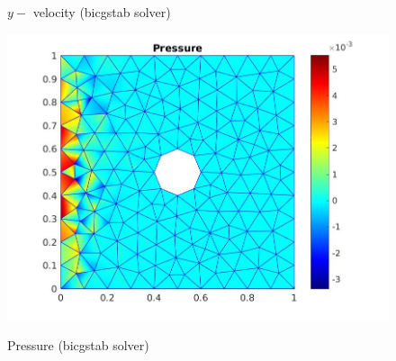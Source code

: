 \documentclass[a4paper]{book}
\begin{document}
\begin{figure}
\begin{minipage}[c]{0.3\textwidth}
    \caption{$y-$ velocity (bicgstab solver)}
     \label{y_vel_stoke_bicgstab}
  \end{minipage}
  \begin{minipage}[c]{0.67\textwidth}
    \includegraphics[width=\textwidth]{cylinder_bicgstab_pressure.jpg}
  \end{minipage}\hfill
  \begin{minipage}[c]{0.3\textwidth}
    \caption{Pressure (bicgstab solver)}
      \label{pressure_stoke_bicgstab}
  \end{minipage}
\caption{\label{flow_over_cylinder_bicgstab}}
\end{figure}
\end{document}
